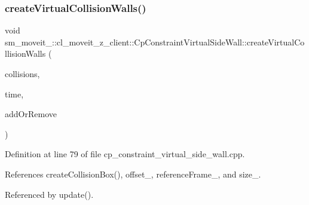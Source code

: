 \subsubsection{\texorpdfstring{create\+Virtual\+Collision\+Walls()}{createVirtualCollisionWalls()}}
{\footnotesize\ttfamily void sm\+\_\+moveit\+\_\+::cl\+\_\+moveit\+\_\+z\+\_\+client\+::\+Cp\+Constraint\+Virtual\+Side\+Wall\+::create\+Virtual\+Collision\+Walls (\begin{DoxyParamCaption}\item[{std\+::vector$<$ moveit\+\_\+msgs\+::\+Collision\+Object $>$ \&}]{collisions,  }\item[{const ros\+::\+Time \&}]{time,  }\item[{int}]{add\+Or\+Remove }\end{DoxyParamCaption})}



Definition at line 79 of file cp\+\_\+constraint\+\_\+virtual\+\_\+side\+\_\+wall.\+cpp.



References create\+Collision\+Box(), offset\+\_\+, reference\+Frame\+\_\+, and size\+\_\+.



Referenced by update().



